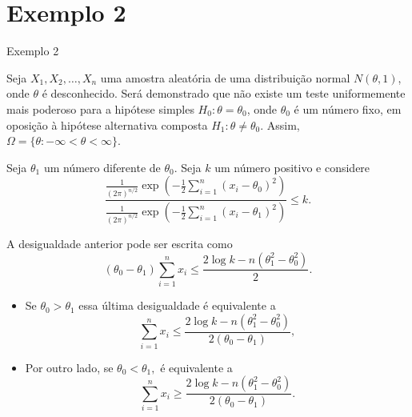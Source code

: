 \documentclass[12pt]{beamer}
\begin{document}
\section{Exemplo 2}
\begin{frame}{Exemplo 2}
\begin{block}{}
\justifying
Seja $X_1, X_2, \ldots, X_n$ uma amostra aleatória de uma distribuição normal $N(\theta, 1)$, onde $\theta$ é desconhecido. Será demonstrado que não existe um teste uniformemente mais poderoso para a hipótese simples $H_0 : \theta = \theta_0$, onde $\theta_0$ é um número fixo, em oposição à hipótese alternativa composta $H_1 : \theta \neq \theta_0$. Assim, $\Omega = \{\theta : -\infty < \theta < \infty\}$.
\end{block}
\pause
\begin{block}{}
	\justifying
	Seja $\theta_1$ um número diferente de $\theta_0$. Seja $k$ um número positivo e considere
	\[
	\dfrac{\frac{1}{(2\pi)^{n/2}} \exp\left(-\frac{1}{2}{\displaystyle \sum_{i=1}^{n}(x_i - \theta_{0})^2}\right) }{\frac{1}{(2\pi)^{n/2}} \exp\left(-\frac{1}{2}{\displaystyle \sum_{i=1}^{n}(x_i - \theta_1)^2}\right)} \leq k.
	\]
\end{block}
\end{frame}

\begin{frame}{}
\begin{block}{}
\justifying
A desigualdade anterior pode ser escrita como
\[
(\theta_{0} - \theta_{1})\sum_{i=1}^{n}x_i \leq \dfrac{2\log k -n(\theta_{1}^{2}-\theta_{0}^{2})}{2}.
\]
\end{block}
\pause
\begin{block}{}
	\justifying
	\begin{itemize}
		\item Se $\theta_{0} > \theta_1$ essa última desigualdade é equivalente a
		\[
		\sum_{i=1}^{n}x_i \leq \dfrac{2\log k -n(\theta_{1}^{2}-\theta_{0}^{2})}{2(\theta_{0} - \theta_{1})},
		\]\pause
		\item Por outro lado, se $\theta_{0} < \theta_1,$ é equivalente a
		\[
		\sum_{i=1}^{n}x_i \geq \dfrac{2\log k -n(\theta_{1}^{2}-\theta_{0}^{2})}{2(\theta_{0} - \theta_{1})}.
		\] 
	\end{itemize}
\end{block}
\end{frame}
\end{document}
